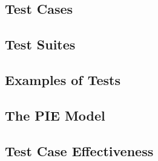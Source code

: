 


\subsection{Test Cases}



\subsection{Test Suites}



\subsection{Examples of Tests}







\subsection{The PIE Model}



\subsection{Test Case Effectiveness}















